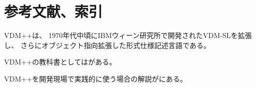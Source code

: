 \documentclass[a4paper,10pt]{jsarticle}
\begin{document}
%
%
%

\newpage

\section{参考文献、索引}
VDM++\cite{Kyushu2016PP}は、
1970年代中頃にIBMウィーン研究所で開発されたVDM-SL\cite{Kyushu2016SL}を拡張し、
さらにオブジェクト指向拡張した形式仕様記述言語である。


VDM++の教科書としては\cite{Sakoh2010}がある。

VDM++を開発現場で実践的に使う場合の解説が\cite{Sahara2008}にある。


%

%


\printindex
\end{document}
